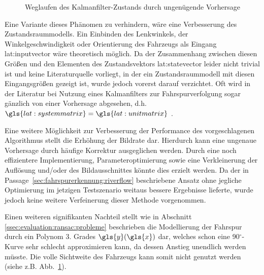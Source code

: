 \begin{figure}[htbp] %
	\centering
	\quad
	\quad
	\quad
	\quad
	\caption{\glqq Weglaufen \grqq des Kalmanfilter-Zustands durch ungenügende Vorhersage}
	\label{fig:evaluation:kalman:weggezogen}
\end{figure}

Eine Variante dieses Phänomen zu verhindern, wäre eine Verbesserung des Zustandsraummodells. 
Ein Einbinden des Lenkwinkels, der Winkelgeschwindigkeit oder Orientierung des Fahrzeugs als Eingang \gls{lat:inputvector} wäre theoretisch möglich. Da der Zusammenhang zwischen diesen Größen und den Elementen des Zustandsvektors \gls{lat:statevector} leider nicht trivial ist und keine Literaturquelle vorliegt, in der ein Zustandsraummodell mit diesen Eingangsgrößen gezeigt ist, wurde jedoch vorerst darauf verzichtet. Oft wird in der Literatur bei Nutzung eines Kalmanfilters zur Fahrspurverfolgung sogar gänzlich von einer Vorhersage abgesehen, d.h. \(\gls{lat:systemmatrix}=\gls{lat:unitmatrix}\) \autocite{limRiverFlowLane2012}.

Eine weitere Möglichkeit zur Verbesserung der Performance des vorgeschlagenen Algorithmus stellt die Erhöhung der Bildrate dar. Hierdurch kann eine ungenaue Vorhersage durch häufige Korrektur ausgeglichen werden. Durch eine noch effizientere Implementierung, Parameteroptimierung sowie eine Verkleinerung der Auflösung und/oder des Bildausschnittes könnte dies erzielt werden. Da der in Passage~\ref{sec:fahrspurerkennung:riverflow} beschriebene Ansatz ohne jegliche Optimierung im jetzigen Testszenario weitaus bessere Ergebnisse lieferte, wurde jedoch keine weitere Verfeinerung dieser Methode vorgenommen.

Einen weiteren signifikanten Nachteil stellt wie in Abschnitt \ref{ssec:evaluation:ransac:probleme} beschrieben die Modellierung der Fahrspur durch ein Polynom 3. Grades \(\gls{y}(\gls{x})\) dar, welches schon eine 90\(^\circ\)-Kurve sehr schlecht approximieren kann, da dessen Anstieg unendlich werden müsste. Die volle Sichtweite des Fahrzeugs kann somit nicht genutzt werden (siehe z.B. Abb.~\ref{fig:evaluation:kalman:weggezogen}).




